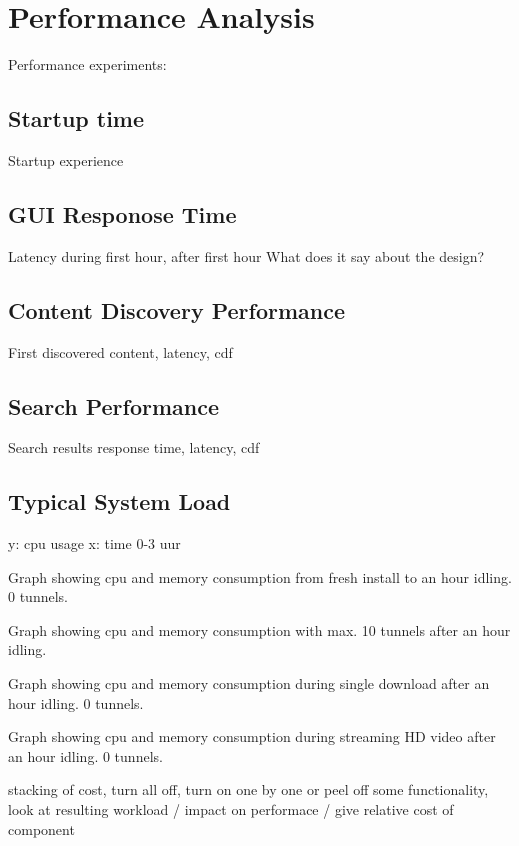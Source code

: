 \chapter{Performance Analysis}
Performance experiments:


\section{Startup time}
Startup experience

\section{GUI Responose Time}
Latency during first hour, after first hour
What does it say about the design?

\section{Content Discovery Performance}
First discovered content, latency, cdf

\section{Search Performance}
Search results response time, latency, cdf





\section{Typical System Load}
y: cpu usage
x: time 0-3 uur

Graph showing cpu and memory consumption from fresh install to an hour idling. 0 tunnels.

Graph showing cpu and memory consumption with max. 10 tunnels after an hour idling.

Graph showing cpu and memory consumption during single download after an hour idling. 0 tunnels.

Graph showing cpu and memory consumption during streaming HD video after an hour idling. 0 tunnels.



stacking of cost, turn all off, turn on one by one or peel off some functionality, look at resulting workload / impact on performace / give relative cost of component

